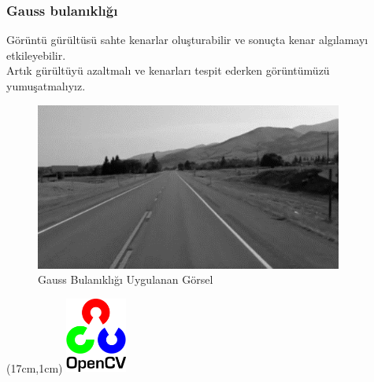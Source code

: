 \documentclass{article}
\begin{document}
\subsubsection{Gauss bulanıklığı}
Görüntü gürültüsü sahte kenarlar oluşturabilir ve sonuçta kenar algılamayı etkileyebilir.\\[2pt]
Artık gürültüyü azaltmalı ve kenarları tespit ederken görüntümüzü yumuşatmalıyız.
\begin{figure}[h]
  \centering
  \includegraphics[width=0.9\textwidth]{image/Resim22.png} %
  \caption{Gauss Bulanıklığı Uygulanan Görsel}
  \label{fig:python20}  
\end{figure}
\newpage
\begin{textblock*}{5cm}(17cm,1cm) %
    \includegraphics[width=2cm]{image/Resim17.png} %
\end{textblock*}
\end{document}
